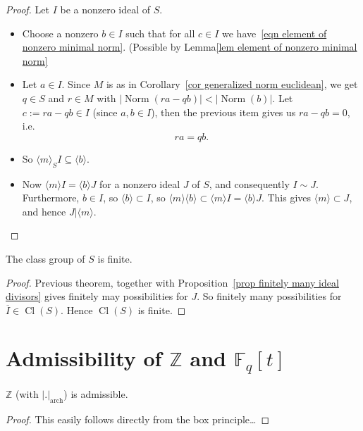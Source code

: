 \documentclass{amsart}
\newcommand{\Z}{\mathbb{Z}}
\newcommand{\F}{\mathbb{F}}
\newcommand{\NN}{\operatorname{Norm}}
\newcommand{\Cl}{\operatorname{Cl}}
\begin{document}
\begin{proof}
Let $I$ be a nonzero ideal of $S$.
\begin{itemize}
\item Choose a nonzero $b \in I$ such that for all $c \in I$ we have~\eqref{eqn element of nonzero minimal norm}.
(Possible by Lemma\ref{lem element of nonzero minimal norm}
\item Let $a \in I$. Since $M$ is as in Corollary~\ref{cor generalized norm euclidean}, we get $q \in S$ and $r \in M$ with $|\NN(r a-qb)| < |\NN(b)|$. Let $c:=ra-qb \in I$ (since $a,b \in I$), then the previous item gives us $ra-qb=0$, i.e.
\[ra=qb.\]
\item
So $\langle m \rangle_S I \subseteq \langle b \rangle$.
\item
Now $ \langle m \rangle I = \langle b \rangle J$ for a nonzero ideal $J$ of $S$, and consequently $I \sim J$. Furthermore, $b \in I$, so $ \langle b \rangle \subset I$, so $ \langle m \rangle \langle b \rangle \subset \langle m \rangle I = \langle b \rangle J$. This gives $\langle m \rangle \subset J$, and hence $J | \langle m \rangle$. 
\end{itemize}
\end{proof}

\begin{theorem}\label{thm class group finite admissible} 
The class group of $S$ is finite.
\end{theorem}

\begin{proof}
Previous theorem, together with Proposition~\ref{prop finitely many ideal divisors} gives finitely may possibilities for $J$. So finitely many possibilities for $\overline{I} \in \Cl(S)$. Hence $\Cl(S)$ is finite.
\end{proof}

\section{Admissibility of $\Z$ and $\F_q[t]$}

\begin{lemma}\label{lem Z admissible}
$\Z$ (with $|.|_{\text{arch}}$) is admissible.
\end{lemma}

\begin{proof}
This easily follows directly from the box principle\ldots
\end{proof}
\end{document}
